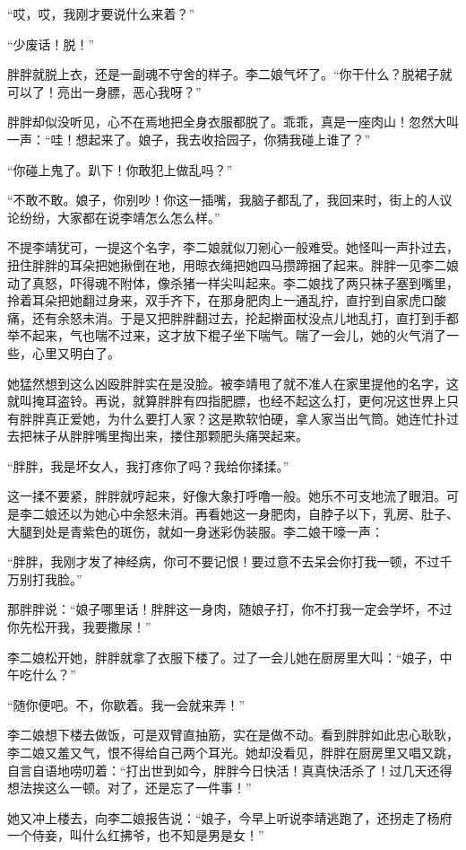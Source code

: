 “哎，哎，我刚才要说什么来着？”

“少废话！脱！”

胖胖就脱上衣，还是一副魂不守舍的样子。李二娘气坏了。“你干什么？脱裙子就可以了！亮出一身膘，恶心我呀？”

胖胖却似没听见，心不在焉地把全身衣服都脱了。乖乖，真是一座肉山！忽然大叫一声：“哇！想起来了。娘子，我去收拾园子，你猜我碰上谁了？”

“你碰上鬼了。趴下！你敢犯上做乱吗？”

“不敢不敢。娘子，你别吵！你这一插嘴，我脑子都乱了，我回来时，街上的人议论纷纷，大家都在说李靖怎么怎么样。”

不提李靖犹可，一提这个名字，李二娘就似刀剜心一般难受。她怪叫一声扑过去，扭住胖胖的耳朵把她揪倒在地，用晾衣绳把她四马攒蹄捆了起来。胖胖一见李二娘动了真怒，吓得魂不附体，像杀猪一样尖叫起来。李二娘找了两只袜子塞到嘴里，拎着耳朵把她翻过身来，双手齐下，在那身肥肉上一通乱拧，直拧到自家虎口酸痛，还有余怒未消。于是又把胖胖翻过去，抡起擀面杖没点儿地乱打，直打到手都举不起来，气也喘不过来，这才放下棍子坐下喘气。喘了一会儿，她的火气消了一些，心里又明白了。

她猛然想到这么凶殴胖胖实在是没脸。被李靖甩了就不准人在家里提他的名字，这就叫掩耳盗铃。再说，就算胖胖有四指肥膘，也经不起这么打，更何况这世界上只有胖胖真正爱她，为什么要打人家？这是欺软怕硬，拿人家当出气筒。她连忙扑过去把袜子从胖胖嘴里掏出来，搂住那颗肥头痛哭起来。

“胖胖，我是坏女人，我打疼你了吗？我给你揉揉。”

这一揉不要紧，胖胖就哼起来，好像大象打呼噜一般。她乐不可支地流了眼泪。可是李二娘还以为她心中余怒未消。再看她这一身肥肉，自脖子以下，乳房、肚子、大腿到处是青紫色的斑伤，就如一身迷彩伪装服。李二娘干嚎一声：

“胖胖，我刚才发了神经病，你可不要记恨！要过意不去呆会你打我一顿，不过千万别打我脸。”

那胖胖说：“娘子哪里话！胖胖这一身肉，随娘子打，你不打我一定会学坏，不过你先松开我，我要撒尿！”

李二娘松开她，胖胖就拿了衣服下楼了。过了一会儿她在厨房里大叫：“娘子，中午吃什么？”

“随你便吧。不，你歇着。我一会就来弄！”

李二娘想下楼去做饭，可是双臂直抽筋，实在是做不动。看到胖胖如此忠心耿耿，李二娘又羞又气，恨不得给自己两个耳光。她却没看见，胖胖在厨房里又唱又跳，自言自语地唠叨着：“打出世到如今，胖胖今日快活！真真快活杀了！过几天还得想法挨这么一顿。对了，还是忘了一件事！”

她又冲上楼去，向李二娘报告说：“娘子，今早上听说李靖逃跑了，还拐走了杨府一个侍妾，叫什么红拂爷，也不知是男是女！”

